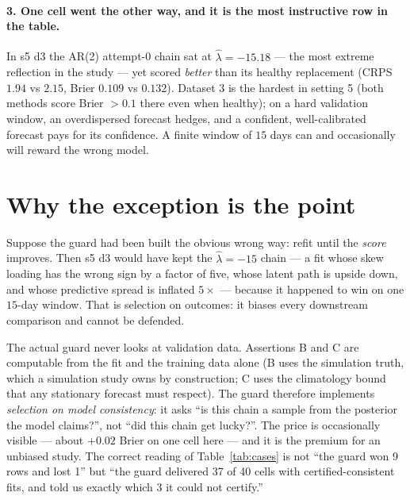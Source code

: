 \documentclass[11pt]{article}
\begin{document}
\paragraph{3. One cell went the other way, and it is the most instructive
row in the table.} In s5 d3 the AR(2) attempt-0 chain sat at
$\hat\lambda = -15.18$ --- the most extreme reflection in the study --- yet
scored \emph{better} than its healthy replacement (CRPS $1.94$ vs $2.15$,
Brier $0.109$ vs $0.132$). Dataset 3 is the hardest in setting 5 (both
methods score Brier $> 0.1$ there even when healthy); on a hard validation
window, an overdispersed forecast hedges, and a confident, well-calibrated
forecast pays for its confidence. A finite window of $15$ days can and
occasionally will reward the wrong model.

\section{Why the exception is the point}

Suppose the guard had been built the obvious wrong way: refit until the
\emph{score} improves. Then s5 d3 would have kept the $\hat\lambda = -15$
chain --- a fit whose skew loading has the wrong sign by a factor of five,
whose latent path is upside down, and whose predictive spread is inflated
$5\times$ --- because it happened to win on one $15$-day window. That is
selection on outcomes: it biases every downstream comparison and cannot be
defended.

The actual guard never looks at validation data. Assertions B and C are
computable from the fit and the training data alone (B uses the simulation
truth, which a simulation study owns by construction; C uses the climatology
bound that any stationary forecast must respect). The guard therefore
implements \emph{selection on model consistency}: it asks ``is this chain a
sample from the posterior the model claims?'', not ``did this chain get
lucky?''. The price is occasionally visible --- about $+0.02$ Brier on one
cell here --- and it is the premium for an unbiased study. The correct
reading of Table~\ref{tab:cases} is not ``the guard won 9 rows and lost 1''
but ``the guard delivered 37 of 40 cells with certified-consistent fits, and
told us exactly which 3 it could not certify.''
\end{document}
